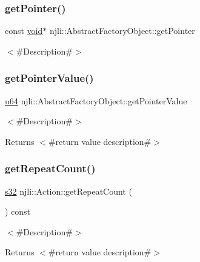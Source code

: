 \subsubsection{\texorpdfstring{get\+Pointer()}{getPointer()}}
{\footnotesize\ttfamily const \mbox{\hyperlink{_thread_8h_af1e856da2e658414cb2456cb6f7ebc66}{void}}$\ast$ njli\+::\+Abstract\+Factory\+Object\+::get\+Pointer}

$<$\#\+Description\#$>$ \mbox{\label{classnjli_1_1_action_a4ffddf141a426a5a07d0ac19f1913811}} 
\subsubsection{\texorpdfstring{get\+Pointer\+Value()}{getPointerValue()}}
{\footnotesize\ttfamily \mbox{\hyperlink{_util_8h_ad758b7a5c3f18ed79d2fcd23d9f16357}{u64}} njli\+::\+Abstract\+Factory\+Object\+::get\+Pointer\+Value}

$<$\#\+Description\#$>$

\begin{DoxyReturn}{Returns}
$<$\#return value description\#$>$ 
\end{DoxyReturn}
\mbox{\label{classnjli_1_1_action_a1f46ddf3b7469fc24cc50ce184ee1926}} 
\subsubsection{\texorpdfstring{get\+Repeat\+Count()}{getRepeatCount()}}
{\footnotesize\ttfamily \mbox{\hyperlink{_util_8h_aa62c75d314a0d1f37f79c4b73b2292e2}{s32}} njli\+::\+Action\+::get\+Repeat\+Count (\begin{DoxyParamCaption}{ }\end{DoxyParamCaption}) const}

$<$\#\+Description\#$>$

\begin{DoxyReturn}{Returns}
$<$\#return value description\#$>$ 
\end{DoxyReturn}
\mbox{\label{classnjli_1_1_action_acccdab60df21ef125bc43e2d914203e8}} 
